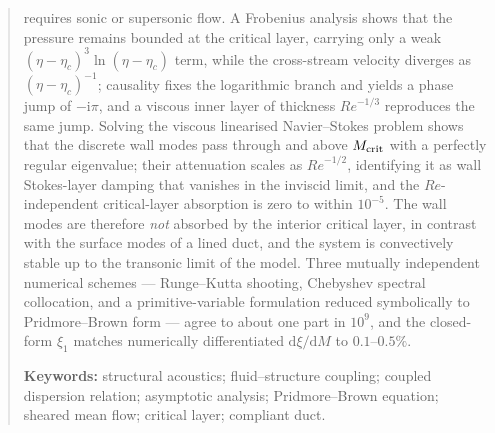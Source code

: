 \documentclass[11pt,a4paper]{article}
\newcommand{\ii}{\mathrm{i}}
\newcommand{\dd}{\mathrm{d}}
\newcommand{\Rey}{\mathit{Re}}
\theoremstyle{plain}
\theoremstyle{remark}
\begin{document}
\begin{abstract}
requires sonic or supersonic flow. A Frobenius analysis shows that the pressure remains bounded at the
critical layer, carrying only a weak $(\eta-\eta_c)^3\ln(\eta-\eta_c)$ term, while the cross-stream
velocity diverges as $(\eta-\eta_c)^{-1}$; causality fixes the logarithmic branch and yields a phase
jump of $-\ii\pi$, and a viscous inner layer of thickness $\Rey^{-1/3}$ reproduces the same jump.
Solving the viscous linearised Navier--Stokes problem shows that the discrete wall modes pass through
and above $M_{\rm crit}$ with a perfectly regular eigenvalue; their attenuation scales as $\Rey^{-1/2}$,
identifying it as wall Stokes-layer damping that vanishes in the inviscid limit, and the
$\Rey$-independent critical-layer absorption is zero to within $10^{-5}$. The wall modes are therefore
\emph{not} absorbed by the interior critical layer, in contrast with the surface modes of a lined duct,
and the system is convectively stable up to the transonic limit of the model. Three mutually
independent numerical schemes --- Runge--Kutta shooting, Chebyshev spectral collocation, and a
primitive-variable formulation reduced symbolically to Pridmore--Brown form --- agree to about one part
in $10^{9}$, and the closed-form $\xi_1$ matches numerically differentiated $\dd\xi/\dd M$ to
$0.1$--$0.5\%$.

\vspace{0.6em}
\noindent\textbf{Keywords:} structural acoustics; fluid--structure coupling; coupled dispersion
relation; asymptotic analysis; Pridmore--Brown equation; sheared mean flow; critical layer; compliant
duct.
\end{abstract}

\tableofcontents
\end{document}
